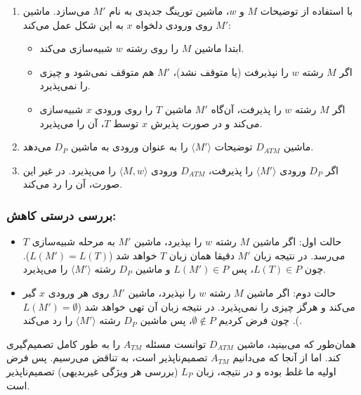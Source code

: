 \begin{enumerate}
    \item با استفاده از توضیحات $M$ و $w$، ماشین تورینگ جدیدی به نام $M'$ می‌سازد. ماشین $M'$ روی ورودی دلخواه $x$ به این شکل عمل می‌کند:
    \begin{itemize}
        \item ابتدا ماشین $M$ را روی رشته $w$ شبیه‌سازی می‌کند.
        \item اگر $M$ رشته $w$ را نپذیرفت (یا متوقف نشد)، $M'$ هم متوقف نمی‌شود و چیزی را نمی‌پذیرد.
        \item اگر $M$ رشته $w$ را پذیرفت، آن‌گاه $M'$ ماشین $T$ را روی ورودی $x$ شبیه‌سازی می‌کند و در صورت پذیرش $x$ توسط $T$، آن را می‌پذیرد.
    \end{itemize}
    \item ماشین $D_{ATM}$ توضیحات $\langle M' \rangle$ را به عنوان ورودی به ماشین $D_P$ می‌دهد.
    \item اگر $D_P$ ورودی $\langle M' \rangle$ را پذیرفت، $D_{ATM}$ ورودی $\langle M, w \rangle$ را می‌پذیرد. در غیر این صورت، آن را رد می‌کند.
\end{enumerate}

\subsubsection*{بررسی درستی کاهش:}
\begin{itemize}
    \item {حالت اول:} اگر ماشین $M$ رشته $w$ را بپذیرد، ماشین $M'$ به مرحله شبیه‌سازی $T$ می‌رسد. در نتیجه زبان $M'$ دقیقا همان زبان $T$ خواهد شد ($L(M') = L(T)$). چون $L(T) \in P$، پس $L(M') \in P$ و ماشین $D_P$ رشته $\langle M' \rangle$ را می‌پذیرد.
    \item {حالت دوم:} اگر ماشین $M$ رشته $w$ را نپذیرد، ماشین $M'$ روی هر ورودی $x$ گیر می‌کند و هرگز چیزی را نمی‌پذیرد. در نتیجه زبان آن تهی خواهد شد ($L(M') = \emptyset$). چون فرض کردیم $\emptyset \notin P$، پس ماشین $D_P$ رشته $\langle M' \rangle$ را رد می‌کند.
\end{itemize}

همان‌طور که می‌بینید، ماشین $D_{ATM}$ توانست مسئله $A_{TM}$ را به طور کامل تصمیم‌گیری کند. اما از آنجا که می‌دانیم $A_{TM}$ تصمیم‌ناپذیر است، به تناقض می‌رسیم. پس فرض اولیه ما غلط بوده و در نتیجه، زبان $L_P$ (بررسی هر ویژگی غیربدیهی) {تصمیم‌ناپذیر} است. 
